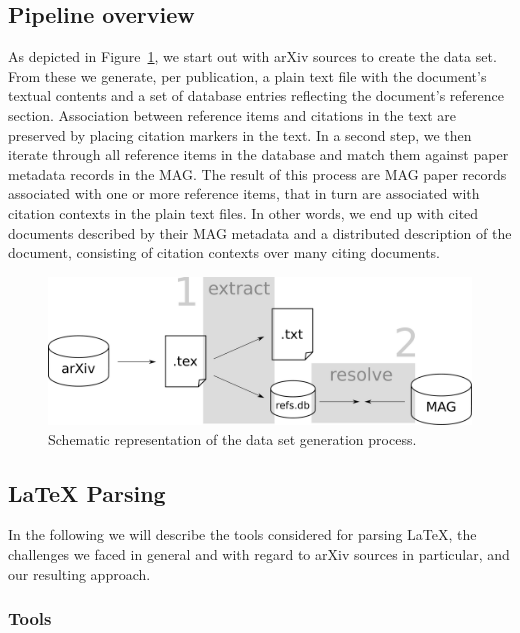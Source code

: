 \subsection{Pipeline overview}

As depicted in Figure~\ref{fig:datagen}, we start out with arXiv sources to create the data set. From these we generate, per publication, a plain text file with the document's textual contents and a set of database entries reflecting the document's reference section. Association between reference items and citations in the text are preserved by placing citation markers in the text. In a second step, we then iterate through all reference items in the database and match them against paper metadata records in the MAG. The result of this process are MAG paper records associated with one or more reference items, that in turn are associated with citation contexts in the plain text files. In other words, we end up with cited documents described by their MAG metadata and a distributed description of the document, consisting of citation contexts over many citing documents.

\begin{figure}
  \centering
    \includegraphics[scale=0.2]{figures/dataset/data_set_generation_schema.pdf}
  \caption{Schematic representation of the data set generation process.}
  \label{fig:datagen}
\end{figure}

\subsection{\LaTeX{} Parsing}
In the following we will describe the tools considered for parsing \LaTeX{}, the challenges we faced in general and with regard to arXiv sources in particular, and our resulting approach.

\subsubsection{Tools}

